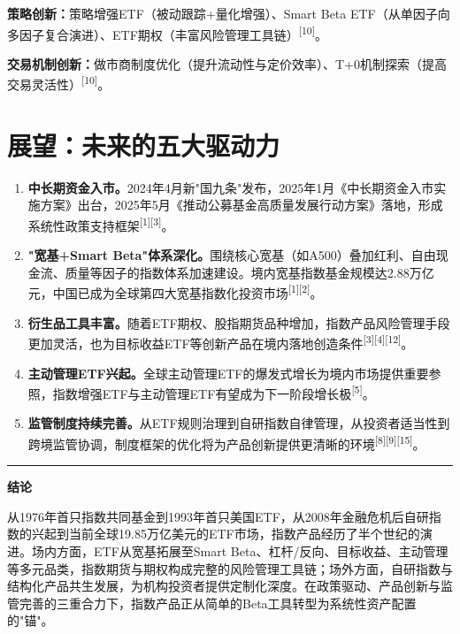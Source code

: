 \documentclass[10pt,a4paper,twocolumn]{ctexart}
\begin{document}
\textbf{策略创新：}策略增强ETF（被动跟踪+量化增强）、Smart Beta ETF（从单因子向多因子复合演进）、ETF期权（丰富风险管理工具链）\textsuperscript{[10]}。

\textbf{交易机制创新：}做市商制度优化（提升流动性与定价效率）、T+0机制探索（提高交易灵活性）\textsuperscript{[10]}。

\section{展望：未来的五大驱动力}

\begin{enumerate}[label=\textcolor{themeblue}{\textbf{\arabic*.}}]
\item \textbf{中长期资金入市。}2024年4月新"国九条"发布，2025年1月《中长期资金入市实施方案》出台，2025年5月《推动公募基金高质量发展行动方案》落地，形成系统性政策支持框架\textsuperscript{[1][3]}。

\item \textbf{"宽基+Smart Beta"体系深化。}围绕核心宽基（如A500）叠加红利、自由现金流、质量等因子的指数体系加速建设。境内宽基指数基金规模达2.88万亿元，中国已成为全球第四大宽基指数化投资市场\textsuperscript{[1][2]}。

\item \textbf{衍生品工具丰富。}随着ETF期权、股指期货品种增加，指数产品风险管理手段更加灵活，也为目标收益ETF等创新产品在境内落地创造条件\textsuperscript{[3][4][12]}。

\item \textbf{主动管理ETF兴起。}全球主动管理ETF的爆发式增长为境内市场提供重要参照，指数增强ETF与主动管理ETF有望成为下一阶段增长极\textsuperscript{[5]}。

\item \textbf{监管制度持续完善。}从ETF规则治理到自研指数自律管理，从投资者适当性到跨境监管协调，制度框架的优化将为产品创新提供更清晰的环境\textsuperscript{[8][9][15]}。
\end{enumerate}

\vspace{6pt}
\noindent\textcolor{themeblue}{\rule{\columnwidth}{1.2pt}}
\vspace{4pt}

\noindent\textbf{\color{themeblue}结论}

\vspace{4pt}
\noindent 从1976年首只指数共同基金到1993年首只美国ETF，从2008年金融危机后自研指数的兴起到当前全球19.85万亿美元的ETF市场，指数产品经历了半个世纪的演进。场内方面，ETF从宽基拓展至Smart Beta、杠杆/反向、目标收益、主动管理等多元品类，指数期货与期权构成完整的风险管理工具链；场外方面，自研指数与结构化产品共生发展，为机构投资者提供定制化深度。在政策驱动、产品创新与监管完善的三重合力下，指数产品正从简单的Beta工具转型为系统性资产配置的"锚"。
\end{document}

